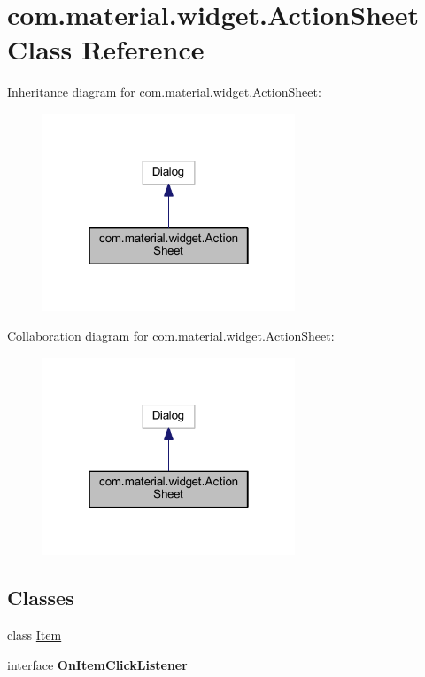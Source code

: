 \hypertarget{classcom_1_1material_1_1widget_1_1_action_sheet}{}\section{com.\+material.\+widget.\+Action\+Sheet Class Reference}
\label{classcom_1_1material_1_1widget_1_1_action_sheet}


Inheritance diagram for com.\+material.\+widget.\+Action\+Sheet\+:
\nopagebreak
\begin{figure}[H]
\begin{center}
\leavevmode
\includegraphics[width=214pt]{classcom_1_1material_1_1widget_1_1_action_sheet__inherit__graph}
\end{center}
\end{figure}


Collaboration diagram for com.\+material.\+widget.\+Action\+Sheet\+:
\nopagebreak
\begin{figure}[H]
\begin{center}
\leavevmode
\includegraphics[width=214pt]{classcom_1_1material_1_1widget_1_1_action_sheet__coll__graph}
\end{center}
\end{figure}
\subsection*{Classes}
\begin{DoxyCompactItemize}
\item 
class \hyperlink{classcom_1_1material_1_1widget_1_1_action_sheet_1_1_item}{Item}
\item 
interface {\bfseries On\+Item\+Click\+Listener}
\end{DoxyCompactItemize}
